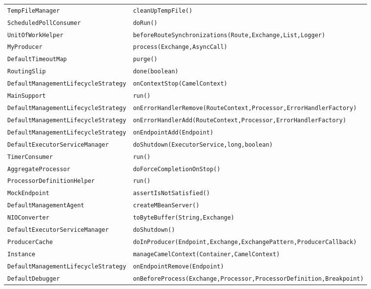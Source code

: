 \begin{center}
\begin{longtable}{ll}
\lstinline/TempFileManager/&{\lstinline/cleanUpTempFile()/}\\
\lstinline/ScheduledPollConsumer/&{\lstinline/doRun()/}\\
\lstinline/UnitOfWorkHelper/&{\lstinline/beforeRouteSynchronizations(Route,Exchange,List,Logger)/}\\
\lstinline/MyProducer/&{\lstinline/process(Exchange,AsyncCall)/}\\
\lstinline/DefaultTimeoutMap/&{\lstinline/purge()/}\\
\lstinline/RoutingSlip/&{\lstinline/done(boolean)/}\\
\lstinline/DefaultManagementLifecycleStrategy/&{\lstinline/onContextStop(CamelContext)/}\\
\lstinline/MainSupport/&{\lstinline/run()/}\\
\lstinline/DefaultManagementLifecycleStrategy/&{\lstinline/onErrorHandlerRemove(RouteContext,Processor,ErrorHandlerFactory)/}\\
\lstinline/DefaultManagementLifecycleStrategy/&{\lstinline/onErrorHandlerAdd(RouteContext,Processor,ErrorHandlerFactory)/}\\
\lstinline/DefaultManagementLifecycleStrategy/&{\lstinline/onEndpointAdd(Endpoint)/}\\
\lstinline/DefaultExecutorServiceManager/&{\lstinline/doShutdown(ExecutorService,long,boolean)/}\\
\lstinline/TimerConsumer/&{\lstinline/run()/}\\
\lstinline/AggregateProcessor/&{\lstinline/doForceCompletionOnStop()/}\\
\lstinline/ProcessorDefinitionHelper/&{\lstinline/run()/}\\
\lstinline/MockEndpoint/&{\lstinline/assertIsNotSatisfied()/}\\
\lstinline/DefaultManagementAgent/&{\lstinline/createMBeanServer()/}\\
\lstinline/NIOConverter/&{\lstinline/toByteBuffer(String,Exchange)/}\\
\lstinline/DefaultExecutorServiceManager/&{\lstinline/doShutdown()/}\\
\lstinline/ProducerCache/&{\lstinline/doInProducer(Endpoint,Exchange,ExchangePattern,ProducerCallback)/}\\
\lstinline/Instance/&{\lstinline/manageCamelContext(Container,CamelContext)/}\\
\lstinline/DefaultManagementLifecycleStrategy/&{\lstinline/onEndpointRemove(Endpoint)/}\\
\lstinline/DefaultDebugger/&{\lstinline/onBeforeProcess(Exchange,Processor,ProcessorDefinition,Breakpoint)/}\\

\end{longtable}
\end{center}
